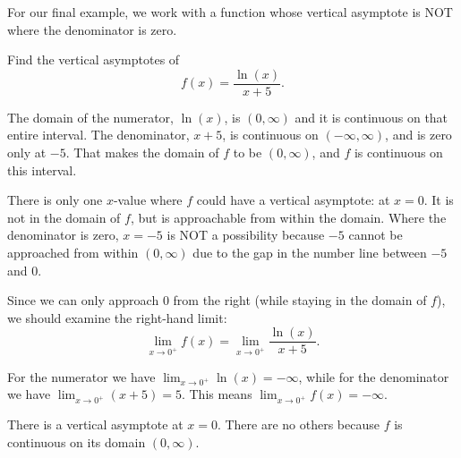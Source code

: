 \documentclass{ximera}
\begin{document}
For our final example, we work with a function whose vertical asymptote is NOT where the denominator is zero.

\begin{example}
	Find the vertical asymptotes of 
	\[ f(x) = \dfrac{\ln(x)}{x+5}. \]
	
	\begin{explanation}
		The domain of the numerator, $\ln(x)$, is $(0,\infty)$ and it is continuous on that entire interval.
		The denominator, $x+5$, is continuous on $(-\infty, \infty)$, and is zero only at $-5$.
		That makes the domain of $f$ to be $(0,\infty)$, and $f$ is continuous on this interval.
		
		There is only one $x$-value where $f$ could have a vertical asymptote: at $x=0$. It is not in the domain of $f$, but is
		approachable from within the domain. Where the denominator is zero, $x=-5$ is NOT a possibility because $-5$ cannot
		be approached from within $(0,\infty)$ due to the gap in the number line between $-5$ and $0$.
		
		Since we can only approach $0$ from the right (while staying in the domain of $f$), we should examine the right-hand limit:
		\[ \lim_{x\to 0^+} f(x) = \lim_{x\to 0^+} \dfrac{\ln(x)}{x+5}. \]
		
		For the numerator we have $\lim_{x\to 0^+} \ln(x) = -\infty$, while for the denominator we have $\lim_{x\to 0^+} (x+5) = 5$. This means
		$\lim_{x\to 0^+} f(x) = -\infty$.
		
		There is a vertical asymptote at $x=0$. There are no others because $f$ is continuous on its domain $(0,\infty)$.

	\end{explanation}
\end{example}
\end{document}
